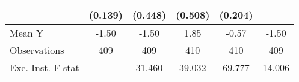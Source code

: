 {\begin{tabular}{l*{5}{c}}
            &     (0.139)         &     (0.448)         &     (0.508)         &     (0.204)         &                     \\
\midrule
Mean Y      &       -1.50         &       -1.50         &        1.85         &       -0.57         &       -1.50         \\
Observations&         409         &         409         &         410         &         410         &         409         \\
Exc. Inst. F-stat&                     &      31.460         &      39.032         &      69.777         &      14.006         \\
\bottomrule
\end{tabular}
}
